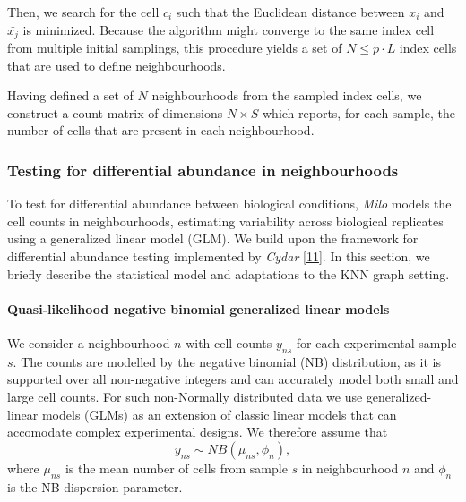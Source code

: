 \documentclass[
]{article}
\begin{document}
Then, we search for the cell \(c_i\) such that the Euclidean distance between \(x_i\) and \(\bar{x_j}\) is minimized. Because the algorithm might converge to the same index cell from multiple initial samplings, this procedure yields a set of \(N \leq p \cdot L\) index cells that are used to define neighbourhoods.

Having defined a set of \(N\) neighbourhoods from the sampled index cells, we construct a count matrix of dimensions \(N \times S\) which reports, for each sample, the number of cells that are present in each neighbourhood.

\hypertarget{testDA}{%
\subsubsection{Testing for differential abundance in neighbourhoods}\label{testDA}}

To test for differential abundance between biological conditions, \emph{Milo} models the cell counts in neighbourhoods, estimating variability across biological replicates using a generalized linear model (GLM). We build upon the framework for differential abundance testing implemented by \emph{Cydar} {[}\protect\hyperlink{ref-lunTestingDifferentialAbundance2017}{11}{]}. In this section, we briefly describe the statistical model and adaptations to the KNN graph setting.

\hypertarget{quasi-likelihood-negative-binomial-generalized-linear-models}{%
\paragraph*{Quasi-likelihood negative binomial generalized linear models}\label{quasi-likelihood-negative-binomial-generalized-linear-models}}

We consider a neighbourhood \(n\) with cell counts \(y_{ns}\) for each experimental sample \(s\). The counts are modelled by the negative binomial (NB) distribution, as it is supported over all non-negative integers and can accurately model both small and large cell counts. For such non-Normally distributed data we use generalized-linear models (GLMs) as an extension of classic linear models that can accomodate complex experimental designs. We therefore assume that
\[
y_{ns} \sim NB(\mu_{ns},\phi_{n}),
\]
where \(\mu_{ns}\) is the mean number of cells from sample \(s\) in neighbourhood \(n\) and \(\phi_{n}\) is the NB dispersion parameter.
\end{document}
